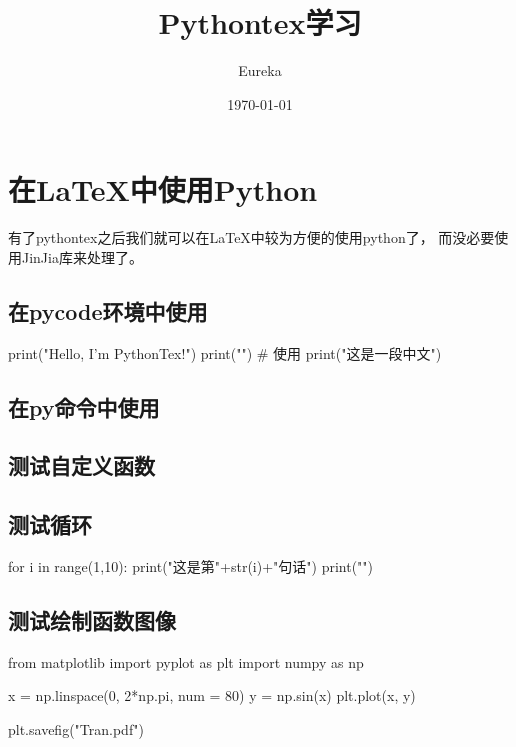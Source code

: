 \documentclass[fontset=windows, 12pt]{article}
\title{Pythontex学习}
\author{Eureka}
\date{\today}
\begin{document}
\maketitle
  \section{在LaTeX中使用Python}
  有了pythontex之后我们就可以在LaTeX中较为方便的使用python了，
  而没必要使用JinJia库来处理了。


  \subsection{在pycode环境中使用}

\begin{pycode} 
print("Hello, I'm PythonTex!")
print("\n")
# 使用
print("这是一段中文")
\end{pycode}

  \subsection{在py命令中使用}

  \subsection{测试自定义函数}

  \newpage
  \subsection{测试循环}
  \begin{pycode}
for i in range(1,10):
  print("这是第"+str(i)+"句话")
  print("\n")
  \end{pycode}


  \subsection{测试绘制函数图像}
    \begin{pycode}
from matplotlib import pyplot as plt
import numpy as np

x = np.linspace(0, 2*np.pi, num = 80)
y = np.sin(x)
plt.plot(x, y)

plt.savefig("Tran.pdf")
    \end{pycode} 
\end{document}
